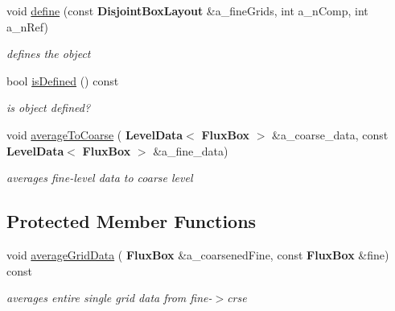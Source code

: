\begin{DoxyCompactItemize}
void \hyperlink{class_coarse_average_edge_afd652746f2915f00ed0b2aaad8888f4f}{define} (const \textbf{ Disjoint\+Box\+Layout} \&a\+\_\+fine\+Grids, int a\+\_\+n\+Comp, int a\+\_\+n\+Ref)
\begin{DoxyCompactList}\small\item\em defines the object \end{DoxyCompactList}\item 
\mbox{\label{class_coarse_average_edge_ae9069e6a699e4c7e68abcae556950654}} 
bool \hyperlink{class_coarse_average_edge_ae9069e6a699e4c7e68abcae556950654}{is\+Defined} () const
\begin{DoxyCompactList}\small\item\em is object defined? \end{DoxyCompactList}\item 
\mbox{\label{class_coarse_average_edge_a66df1f9dfcd7c36e5f03c777ad3889fb}} 
void \hyperlink{class_coarse_average_edge_a66df1f9dfcd7c36e5f03c777ad3889fb}{average\+To\+Coarse} (\textbf{ Level\+Data}$<$ \textbf{ Flux\+Box} $>$ \&a\+\_\+coarse\+\_\+data, const \textbf{ Level\+Data}$<$ \textbf{ Flux\+Box} $>$ \&a\+\_\+fine\+\_\+data)
\begin{DoxyCompactList}\small\item\em averages fine-\/level data to coarse level \end{DoxyCompactList}\end{DoxyCompactItemize}
\subsection*{Protected Member Functions}
\begin{DoxyCompactItemize}
\item 
\mbox{\label{class_coarse_average_edge_a6563eafbf237271a5cc1cc0ceabc1eb8}} 
void \hyperlink{class_coarse_average_edge_a6563eafbf237271a5cc1cc0ceabc1eb8}{average\+Grid\+Data} (\textbf{ Flux\+Box} \&a\+\_\+coarsened\+Fine, const \textbf{ Flux\+Box} \&fine) const
\begin{DoxyCompactList}\small\item\em averages entire single grid data from fine-\/$>$crse \end{DoxyCompactList}\end{DoxyCompactItemize}
